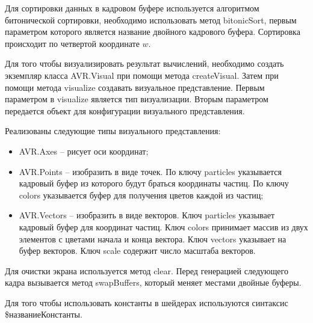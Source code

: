 Для сортировки данных в кадровом буфере используется алгоритмом
битонической сортировки, необходимо использовать метод bitonicSort,
первым параметром которого является название двойного кадрового буфера.
Сортировка происходит по четвертой координате $w$.


Для того чтобы визуализировать результат вычислений, необходимо создать
экземпляр класса AVR.Visual при помощи метода createVisual. Затем
при помощи метода visualize создавать визуальное представление.
Первым параметром в visualize является тип визуализации. Вторым параметром
передается объект для конфигурации визуального представления.

Реализованы следующие типы визуального представления:

\begin{itemize}
  \item AVR.Axes -- рисует оси координат;
  \item AVR.Points -- изобразить в виде точек. По ключу particles
    указывается кадровый буфер из которого будут браться координаты частиц.
    По ключу colors указывается буфер для получения цветов каждой из частиц;
  \item AVR.Vectors -- изобразить в виде векторов. Ключ particles
    указывает кадровый буфер для координат частиц. Ключ colors
    принимает массив из двух элементов с цветами начала и конца вектора. Ключ
    vectors указывает на буфер векторов. Ключ scale содержит число масштаба
    векторов.
\end{itemize}

Для очистки экрана используется метод clear. Перед генерацией следующего
кадра вызывается метод swapBuffers, который меняет местами двойные буферы.






Для того чтобы использовать константы в шейдерах используются синтаксис
\$названиеКонстанты.

